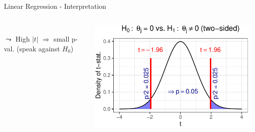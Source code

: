 \documentclass[11pt,compress,t,notes=noshow, aspectratio=169, xcolor=table]{beamer}
\begin{document}
\begin{frame}{Linear Regression - Interpretation}
{\begin{columns}[T, totalwidth=\linewidth]
\begin{column}{0.6\textwidth}
\begin{itemize}
        \\
        $\leadsto$ High $|t|$ $\Rightarrow$ small p-val. (speak against $H_0$)
    \end{itemize}
    \end{column}
    \begin{column}{0.4\textwidth}
        \includegraphics[width=\textwidth]{figure/p-value.pdf}
    \end{column}
    \end{columns}}
\end{frame}
\end{document}
